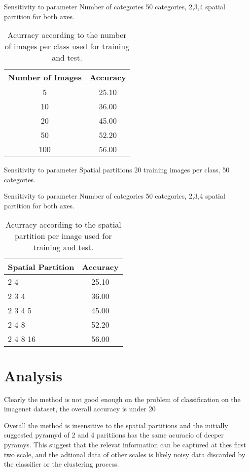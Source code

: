\documentclass[10pt,twocolumn,letterpaper]{article}
\begin{document}
Sensitivity to parameter Number of categories
50 categories,  2,3,4 spatial partition for both axes.

\begin{table}[t]
\centering
\begin{tabular}{c | c }
Number of Images & Accuracy    \\
\hline	
5 & 25.10  \\
10 & 36.00 \\
20 & 45.00 \\
50 & 52.20 \\
100 & 56.00 \\

\end{tabular}
\caption{Acurracy according to the number of images per class used for training and test. 
}
\label{table:tableClases}
\end{table}


Sensitivity to parameter Spatial partitions
20 training images per class, 50 categories.

Sensitivity to parameter Number of categories
50 categories,  2,3,4 spatial partition for both axes.

\begin{table}[t]
\centering
\begin{tabular}{l | c }
Spatial Partition & Accuracy    \\
\hline	
2 4 & 25.10  \\
2 3 4  & 36.00 \\
2 3 4 5 & 45.00 \\
2 4 8 & 52.20 \\
2 4 8 16 & 56.00 \\

\end{tabular}
\caption{Acurracy according to the spatial partition per image used for training and test. 
}
\label{table:tableClases}
\end{table}

\section{Analysis}

Clearly the method is not good enough on the problem of classification on the imagenet dataset, the overall accuracy is under 20%

Overall the method is insensitive to the spatial partitions and the initially suggested pyramyd of 2 and 4 paritiions has the same acuracio of deeper pyramys. This suggest that the relevat information can be captured at thes first two scale, and the adtional data of other scales is likely noisy data discarded by the classifier or the clustering process.
\end{document}
